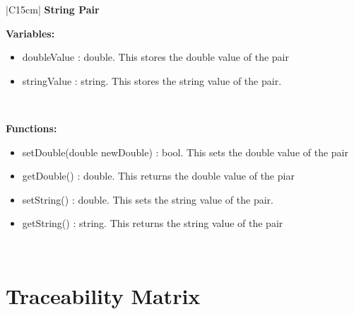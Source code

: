 \documentclass[letterpaper,english, 12pt]{scrreprt}
\begin{document}
\begin{center}
        \begin{tabular}{|C{15cm}|}
                \hline
                        \textbf{String Pair} \\
                \hline
                        \begin{flushleft}
                                \textbf{Variables: }\\
                        \end{flushleft}
                                \begin{itemize}
                                        \item doubleValue : double. This stores the double value of the pair
                                        \item stringValue : string. This stores the string value of the pair.
                                \end{itemize} \\
                        \hline
                        \begin{flushleft}
                                \textbf{Functions: } \\
                        \end{flushleft}
                                \begin{itemize}
                                        \item setDouble(double newDouble) : bool. This sets the double value of the pair
                                        \item getDouble() : double. This returns the double value of the piar
                                        \item setString() : double. This sets the string value of the pair.
                                        \item getString() : string. This returns the string value of the pair
                                \end{itemize} \\
                        \hline
        \end{tabular}
\end{center}



\section{Traceability Matrix}
\end{document}
